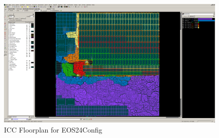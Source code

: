 \documentclass{article}
\begin{document}
\begin{figure}
  \begin{center}
    \includegraphics[width=0.95\linewidth]{figures/icc-hwacha.png}
  \end{center}
  \caption{ICC Floorplan for EOS24Config}
  \label{res:hwacha-icc}
\end{figure}
\end{document}
